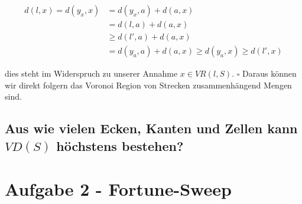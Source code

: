 \documentclass[a4paper]{article}
\begin{document}
\begin{align}
d(l,x)=d(y_x, x) &= d(y_x,a)+d(a, x)\\
&= d(l, a) +  d(a, x) \\
&\geq d(l', a) +  d(a, x) \\
&= d(y_a, a) +  d(a, x) \geq d(y_a, x) \geq d(l', x)
\end{align} 

dies steht im Widerspruch zu unserer Annahme $x \in VR(l,S)$. $\square$ Daraus können wir direkt folgern das Voronoi Region von Strecken zusammenhängend Mengen sind.

\cite{Klein1997}

\subsection*{Aus wie vielen Ecken, Kanten und Zellen kann $VD(S)$ höchstens bestehen?}




\section*{Aufgabe 2 - Fortune-Sweep}
\end{document}
